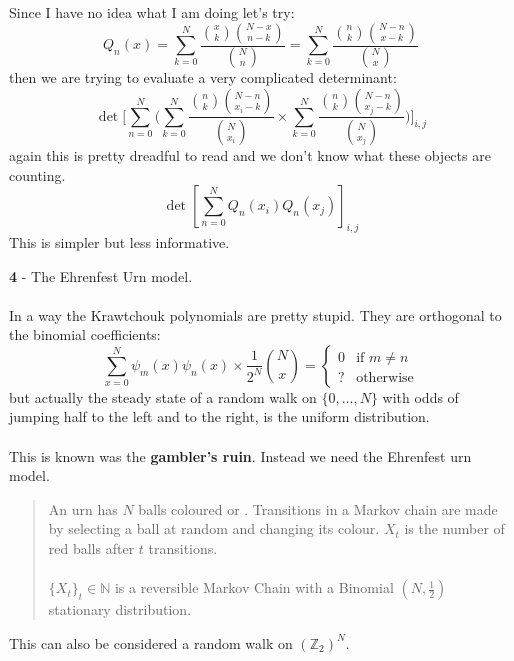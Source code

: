 \documentclass[12pt]{article}
\begin{document}
\newpage

\noindent Since I have no idea what I am doing let's try:
$$ Q_n(x) = \sum_{k = 0}^N \frac{\binom{x}{k}\binom{N-x}{n-k}}{\binom{N}{n}}
= \sum_{k = 0}^N \frac{\binom{n}{k}\binom{N-n}{x-k}}{\binom{N}{x}} $$
then we are trying to evaluate a very complicated determinant:
$$ \det \Bigg[ 
\sum_{n=0}^N \bigg(
\sum_{k = 0}^N \frac{\binom{n}{k}\binom{N-n}{x_i-k}}{\binom{N}{x_i}} \times 
\sum_{k = 0}^N \frac{\binom{n}{k}\binom{N-n}{x_j-k}}{\binom{N}{x_j}}\bigg)
\Bigg]_{i,j} $$
again this is pretty dreadful to read and we don't know what these objects are counting.
$$ \det \left[ \sum_{n=0}^N Q_n(x_i) Q_n(x_j)\right]_{i,j}$$
This is simpler but less informative.  

\newpage

\noindent \textbf{4} - The Ehrenfest Urn model.  \\ \\
In a way the Krawtchouk polynomials are pretty stupid.  They are orthogonal to the binomial coefficients:
$$ \sum_{x=0}^N \psi_m(x) \psi_n(x) \times \frac{1}{2^N} \binom{N}{x} = \left\{
\begin{array}{cl} 0 & \text{if }m \neq n \\
? & \text{otherwise}\end{array}
 \right.$$
but actually the steady state of a random walk on $\{ 0, \dots, N\}$ with odds of jumping half to the left and to the right, is the uniform distribution.  \\ \\
This is known was the \textbf{gambler's ruin}.  Instead we need the Ehrenfest urn model.  

\begin{quotation}
An urn has $N$ balls coloured {\color{red}{red}} or {\color{blue}{blue}}. Transitions in a Markov chain
are made by selecting a ball at random and changing its colour. $X_t$
is the
number of red balls after $t$ transitions. \\ \\ $\{X_t\}_t \in \mathbb{N}$ is a reversible Markov Chain
with a Binomial $(N, \frac{1}{2})$ stationary distribution. \end{quotation}

\newpage

\noindent This can also be considered a random walk on $(\mathbb{Z}_2)^N$.

\newpage

\selectfont \fontsize{12}{10}\selectfont
\end{document}
